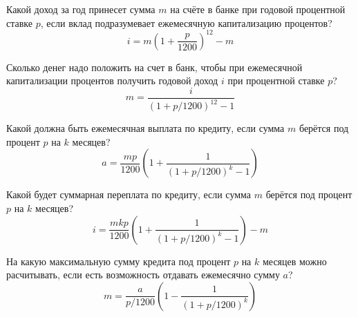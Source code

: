 \begin{zztask}
Какой доход за год принесет сумма $m$ на счёте в банке при годовой
процентной ставке $p$, если вклад подразумевает ежемесячную
капитализацию процентов?
%
\[
i = m \left(1 + \frac{p}{1200}\right)^{12} - m
\]
\end{zztask}


\begin{zztask}
Сколько денег надо положить на счет в банк, чтобы при ежемесячной
капитализации процентов получить годовой доход $i$ при процентной
ставке $p$?
%
\[
m = \frac{i}{\left(1 + p/1200\right)^{12} - 1}
\]
\end{zztask}


\begin{zztask}
Какой должна быть ежемесячная выплата по кредиту, если сумма $m$ берётся 
под процент $p$ на $k$ месяцев?
%
\[
a = \frac{mp}{1200}\left(1 + \frac{1}{(1 + p/1200)^k - 1}\right)
\]
\end{zztask}


\begin{zztask}
Какой будет суммарная переплата по кредиту, если сумма $m$ берётся
под процент $p$ на $k$ месяцев?
%
\[
i = \frac{mkp}{1200}\left(1 + \frac{1}{(1 + p/1200)^k - 1}\right) - m
\]
\end{zztask}


\begin{zztask}
На какую максимальную сумму кредита под процент $p$ на $k$ месяцев
можно расчитывать, если есть возможность отдавать ежемесячно сумму $a$?
%
\[
m = \frac{a}{p/1200}\left(1 - \frac{1}{(1 + p/1200)^k}\right)
\]
\end{zztask}


